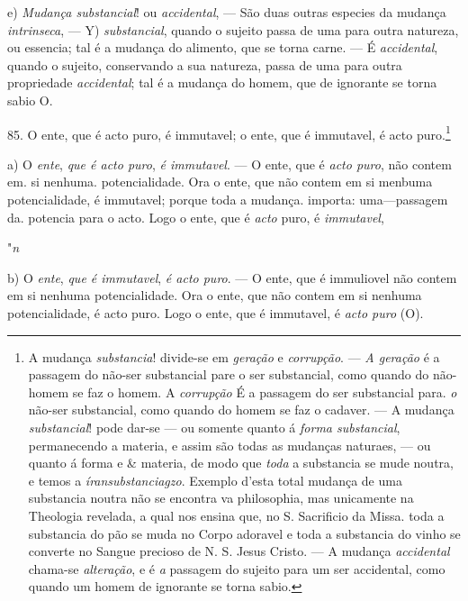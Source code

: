 e) \emph{Mudança substancial}! ou \emph{accidental}, --- São duas outras especies da mudança \emph{intrinseca}, --- Y) \emph{substancial}, quando o sujeito passa de uma para outra natureza, ou essencia; tal é a mudança do alimento, que se torna carne. --- É \emph{accidental}, quando o sujeito, conservando a sua natureza, passa de uma para outra propriedade \emph{accidental}; tal é a mudança do homem, que de ignorante se torna sabio O.

85. O ente, que é acto puro, é immutavel; o ente, que é immutavel, é acto puro.\footnote{A mudança \emph{substancia}! divide-se em \emph{geração} e \emph{corrupção}. --- \emph{A geração} é a passagem do não-ser substancial pare o ser substancial, como quando do não-homem se faz o homem. A \emph{corrupção} É a passagem do ser substancial para. \emph{o} não-ser substancial, como quando do homem se faz o cadaver. --- A mudança \emph{substancial}! pode dar-se --- ou somente quanto á \emph{forma substancial}, permanecendo a materia, e assim são todas as mudanças naturaes, --- ou quanto á forma e \& materia, de modo que \emph{toda} a substancia se mude noutra, e temos a \emph{íransubstanciagzo}. Exemplo d'esta total mudança de uma substancia noutra não se encontra va philosophia, mas unicamente na Theologia revelada, a qual nos ensina que, no S. Sacrificio da Missa. toda a substancia do pão se muda no Corpo adoravel e toda a substancia do vinho se converte no Sangue precioso de N. S. Jesus Cristo. --- A mudança \emph{accidental} chama-se \emph{alteração}, e é \emph{a} passagem do sujeito para um ser accidental, como quando um homem de ignorante se torna sabio.}

 a) O \emph{ente}, \emph{que é acto puro}, \emph{é immutavel}. --- O ente, que é \emph{acto puro}, não contem em. si nenhuma. potencialidade. Ora o ente, que não contem em si menbuma potencialidade, é immutavel; porque toda a mudança. importa: uma---passagem da. potencia para o acto. Logo o ente, que é \emph{acto} puro, é \emph{immutavel},

"\emph{n}

b) O \emph{ente}, \emph{que é immutavel}, \emph{é acto puro}. --- O ente, que é immuliovel não contem em si nenhuma potencialidade. Ora o ente, que não contem em si nenhuma potencialidade, é acto puro. Logo o ente, que é immutavel, é \emph{acto puro} (O).

